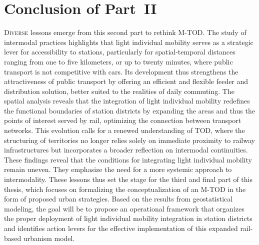 
\cleardoublepage
\section*{Conclusion of Part~II
    \label{part2:conclusion}
    }

\lettrine[lines=3, findent=8pt, nindent=0pt]{ D}{iverse} lessons emerge from this second part to rethink \acrshort{M-TOD}. The study of intermodal practices highlights that light individual mobility serves as a strategic lever for accessibility to stations, particularly for spatial-temporal distances ranging from one to five kilometers, or up to twenty minutes, where public transport is not competitive with cars. Its development thus strengthens the attractiveness of public transport by offering an efficient and flexible feeder and distribution solution, better suited to the realities of daily commuting. The spatial analysis reveals that the integration of light individual mobility redefines the functional boundaries of station districts by expanding the areas and thus the points of interest served by rail, optimizing the connection between transport networks. This evolution calls for a renewed understanding of \acrshort{TOD}, where the structuring of territories no longer relies solely on immediate proximity to railway infrastructures but incorporates a broader reflection on intermodal continuities. These findings reveal that the conditions for integrating light individual mobility remain uneven. They emphasize the need for a more systemic approach to intermodality. These lessons thus set the stage for the third and final part of this thesis, which focuses on formalizing the conceptualization of an \acrshort{M-TOD} in the form of proposed urban strategies. Based on the results from geostatistical modeling, the goal will be to propose an operational framework that organizes the proper deployment of light individual mobility integration in station districts and identifies action levers for the effective implementation of this expanded rail-based urbanism model.%
